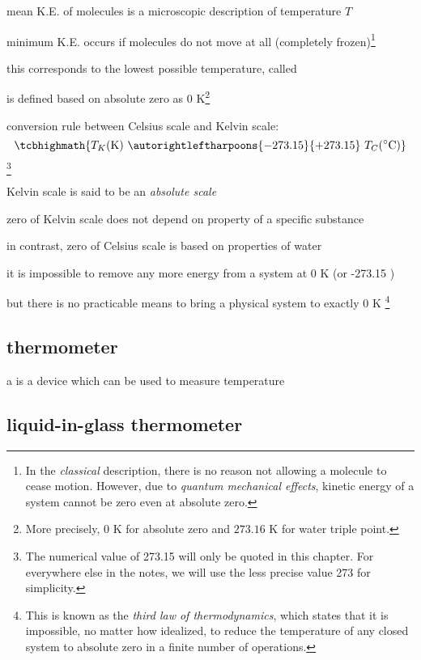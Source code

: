 mean K.E. of molecules is a microscopic description of temperature $T$

minimum K.E. occurs if molecules do not move at all (completely frozen)\footnote{In the \emph{classical} description, there is no reason not allowing a molecule to cease motion. However, due to \emph{quantum mechanical effects}, kinetic energy of a system cannot be zero even at absolute zero.}

this corresponds to the lowest possible temperature, called 

\cmt {} is defined based on absolute zero as 0 K\footnote{More precisely, 0 K for absolute zero  and $273.16\text{ K}$ for water triple point.}

\cmt conversion rule between Celsius scale and Kelvin scale: $$\tcbhighmath{T_K (\text{K}) \text{ } \autorightleftharpoons{\footnotesize -273.15}{\footnotesize +273.15} \text{ } T_C (\OC)}$$\footnote{The numerical value of 273.15 will only be quoted in this chapter. For everywhere else in the notes, we will use the less precise value 273 for simplicity.}

\cmt Kelvin scale is said to be an \emph{absolute scale}

zero of Kelvin scale does not depend on property of a specific substance

in contrast, zero of Celsius scale is based on properties of water

\cmt it is impossible to remove any more energy from a system at 0 K (or -273.15 \OC)

but there is no practicable means to bring a physical system to exactly $0\text{ K}$
\footnote{This is known as the \emph{third law of thermodynamics}, which states that it is impossible, no matter how idealized, to reduce the temperature of any closed system to absolute zero in a finite number of operations.}




\subsection{thermometer}

a  is a device which can be used to measure temperature



\subsection*{liquid-in-glass thermometer}

